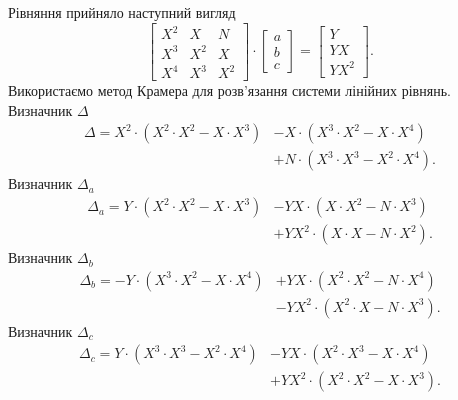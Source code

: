 Рівняння прийняло наступний вигляд
\begin{equation*}
  \begin{bmatrix}
    X^2 & X   & N \\
    X^3 & X^2 & X \\
    X^4 & X^3 & X^2
  \end{bmatrix}
  \cdot
  \begin{bmatrix}
    a \\
    b \\
    c
  \end{bmatrix}
  =
  \begin{bmatrix}
    Y \\
    YX \\
    YX^2
  \end{bmatrix}.
\end{equation*}
Використаємо метод Крамера для розв’язання системи лінійних рівнянь.
Визначник $\Delta$
\begin{equation*}
  \begin{split}
    \Delta
    = X^2 \cdot \left( X^2 \cdot X^2 - X  \cdot X^3 \right)
       &- X \cdot \left( X^3 \cdot X^2 - X  \cdot X^4 \right) \\
       &+ N \cdot \left( X^3 \cdot X^3 - X^2 \cdot X^4 \right).
  \end{split}
\end{equation*}
Визначник $\Delta_a$
\begin{equation*}
  \begin{split}
    \Delta_a
    =     Y   \cdot \left( X^2 \cdot X^2 - X \cdot X^3 \right)
      &- YX   \cdot \left( X   \cdot X^2 - N \cdot X^3 \right) \\
      &+ YX^2 \cdot \left( X   \cdot X   - N \cdot X^2 \right).
  \end{split}
\end{equation*}
Визначник $\Delta_b$
\begin{equation*}
  \begin{split}
    \Delta_b
    =  -  Y   \cdot \left( X^3 \cdot X^2 - X \cdot X^4 \right)
      &+ YX   \cdot \left( X^2 \cdot X^2 - N \cdot X^4 \right) \\
      &- YX^2 \cdot \left( X^2 \cdot X   - N \cdot X^3 \right).
  \end{split}
\end{equation*}
Визначник $\Delta_c$
\begin{equation*}
  \begin{split}
    \Delta_c
    =     Y   \cdot \left( X^3 \cdot X^3 - X^2 \cdot X^4 \right)
      &- YX   \cdot \left( X^2 \cdot X^3 - X   \cdot X^4 \right) \\
      &+ YX^2 \cdot \left( X^2 \cdot X^2 - X   \cdot X^3 \right).
  \end{split}
\end{equation*}

